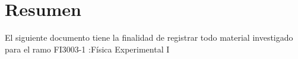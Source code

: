 \documentclass[letterpaper,11pt]{article}
\begin{document}
\renewcommand{\tablename}{Tabla}
\renewcommand{\figurename}{Figura}
\renewcommand{\contentsname}{Índice}
\renewcommand{\listtablename}{Índice de tablas}
\renewcommand{\appendixname}{Anexo}
\renewcommand{\appendixtocname}{Anexos}
\renewcommand{\appendixpagename}{Anexos}



	\oddsidemargin 0cm \topmargin -2cm \textheight 21cm \textwidth
	16.5cm \headheight 1cm \linespread {1.0} \headsep 1cm \parindent 0mm

	

	\topmargin 0cm
	\pagestyle{empty}
	\pagestyle{fancy}

\setlength{\parskip}{8pt}
\setlength{\parindent}{12pt}


\section*{Resumen}

El siguiente documento tiene la finalidad de registrar todo material investigado para el ramo FI3003-1 :Física Experimental I 



\newpage



\begin{center}
\tableofcontents
\end{center}
\newpage


\begin{center}
\listoffigures
\end{center}
\newpage

\begin{center}
\listoftables
\end{center}
\newpage

%
%
%
\end{document}
